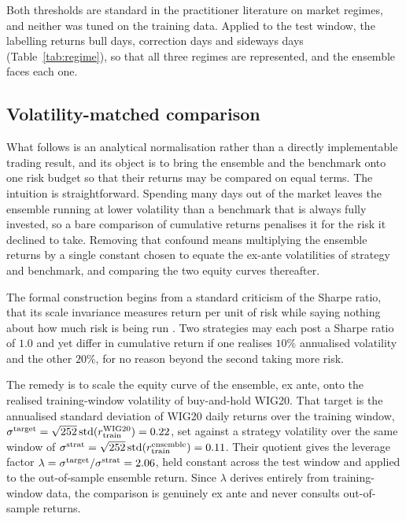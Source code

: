Both thresholds are standard in the practitioner literature on market regimes, and neither was tuned on the training data. Applied to the test window, the labelling returns \RegBullShare{} bull days, \RegCorrectionShare{} correction days and \RegSidewaysShare{} sideways days (Table~\ref{tab:regime}), so that all three regimes are represented, and the ensemble faces each one.

\subsection{Volatility-matched comparison}\label{subsec:volmatch}

What follows is an analytical normalisation rather than a directly implementable trading result, and its object is to bring the ensemble and the benchmark onto one risk budget so that their returns may be compared on equal terms. The intuition is straightforward. Spending many days out of the market leaves the ensemble running at lower volatility than a benchmark that is always fully invested, so a bare comparison of cumulative returns penalises it for the risk it declined to take. Removing that confound means multiplying the ensemble returns by a single constant chosen to equate the ex-ante volatilities of strategy and benchmark, and comparing the two equity curves thereafter.

The formal construction begins from a standard criticism of the Sharpe ratio, that its scale invariance measures return per unit of risk while saying nothing about how much risk is being run \cite{harvey2016}. Two strategies may each post a Sharpe ratio of $1.0$ and yet differ in cumulative return if one realises $10\%$ annualised volatility and the other $20\%$, for no reason beyond the second taking more risk.

The remedy is to scale the equity curve of the ensemble, ex ante, onto the realised training-window volatility of buy-and-hold WIG20. That target is the annualised standard deviation of WIG20 daily returns over the training window, $\sigma^{\text{target}} = \sqrt{252}\, \mathrm{std}(r^{\text{WIG20}}_\text{train}) = 0.22{}$, set against a strategy volatility over the same window of $\sigma^{\text{strat}} = \sqrt{252}\,\mathrm{std}(r^{\text{ensemble}}_\text{train}) = 0.11{}$. Their quotient gives the leverage factor $\lambda = \sigma^{\text{target}} / \sigma^{\text{strat}} = 2.06{}$, held constant across the test window and applied to the out-of-sample ensemble return. Since $\lambda$ derives entirely from training-window data, the comparison is genuinely ex ante and never consults out-of-sample returns.

